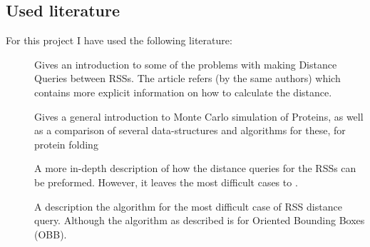 \subsection{Used literature}
For this project I have used the following literature:
\begin{description}
\item[\cite{larsen00fast}] Gives an introduction to some of the problems with making Distance Queries between RSSs. The article refers \cite{Larsen99fastproximity} (by the same authors) which contains more explicit information on how to calculate the distance. 
\item[\cite{Lotan03algorithmand}] Gives a general introduction to Monte Carlo simulation of Proteins, as well as a comparison of several data-structures and algorithms for these, for protein folding 
\item[\cite{Larsen99fastproximity}] A more in-depth description of how the distance queries for the RSSs can be preformed. However, it leaves the most difficult cases to \cite{237244}.
\item[\cite{237244}] A description the algorithm for the most difficult case of RSS distance query. Although the algorithm as described is for Oriented Bounding Boxes (OBB).
\end{description}

